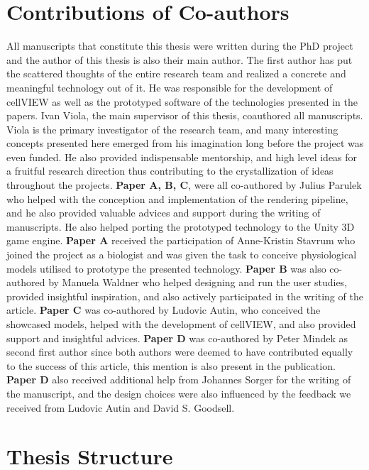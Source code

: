 \section{Contributions of Co-authors}

All manuscripts that constitute this thesis were written during the PhD project and the author of this thesis is also their main author. 
The first author has put the scattered thoughts of the entire research team and realized a concrete and meaningful technology out of it.
He was responsible for the development of cellVIEW as well as the prototyped software of the technologies presented in the papers.
Ivan Viola, the main supervisor of this thesis, coauthored all manuscripts. 
Viola is the primary investigator of the research team, and many interesting concepts presented here emerged from his imagination long before the project was even funded. 
He also provided indispensable mentorship, and high level ideas for a fruitful research direction thus contributing to the crystallization of ideas throughout the projects.
\textbf{Paper A, B, C}, were all co-authored by Julius Parulek who helped with the conception and implementation of the rendering pipeline, and he also provided valuable advices and support during the writing of manuscripts.
He also helped porting the prototyped technology to the Unity 3D game engine. 
\textbf{Paper A} received the participation of Anne-Kristin Stavrum who joined the project as a biologist and was given the task to conceive physiological models utilised to prototype the presented technology.
\textbf{Paper B} was also co-authored by Manuela Waldner who helped designing and run the user studies, provided insightful inspiration, and also actively participated in the writing of the article. 
\textbf{Paper C} was co-authored by Ludovic Autin, who conceived the showcased models, helped with the development of cellVIEW, and also provided support and insightful advices.
\textbf{Paper D} was co-authored by Peter Mindek as second first author since both authors were deemed to have contributed equally to the success of this article, this mention is also present in the publication.
\textbf{Paper D} also received additional help from Johannes Sorger for the writing of the manuscript, and the design choices were also influenced by the feedback we received from Ludovic Autin and David S. Goodsell.

\section{Thesis Structure}

